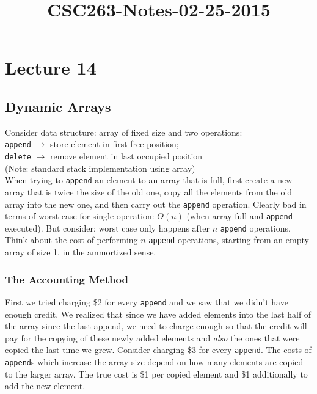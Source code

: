 



\title{CSC263-Notes-02-25-2015}



\section*{Lecture 14}

\subsection*{Dynamic Arrays}

\noindent Consider data structure: array of fixed size and two operations: \\
\indent \texttt{append} $\rightarrow$ store element in first free position; \\
\indent \texttt{delete} $\rightarrow$ remove element in last occupied position \\
(Note: standard stack implementation using array) \\

\noindent When trying to \texttt{append} an element to an array that is full, first create a new array that is twice the size of the old one, copy all the elements from the old array into the new one, and then carry out the \texttt{append} operation. Clearly bad in terms of worst case for single operation: $\Theta(n)$ (when array full and \texttt{append} executed). But consider: worst case only happens after $n$ \texttt{append} operations. Think about the cost of performing $n$ \texttt{append} operations, starting from an empty array of size 1, in the ammortized sense. \\

\subsubsection*{The Accounting Method}

First we tried charging \$2 for every \texttt{append} and we saw that we didn't have enough credit. We realized that since we have added elements into the last half of the array since the last append, we need to charge enough so that the credit will pay for the copying of these newly added elements and \textit{also} the ones that were copied the last time we grew. Consider charging \$3 for every \texttt{append}. The costs of \texttt{append}s which increase the array size depend on how many elements are copied to the larger array. The true cost is \$1 per copied element and \$1 additionally to add the new element. \\

